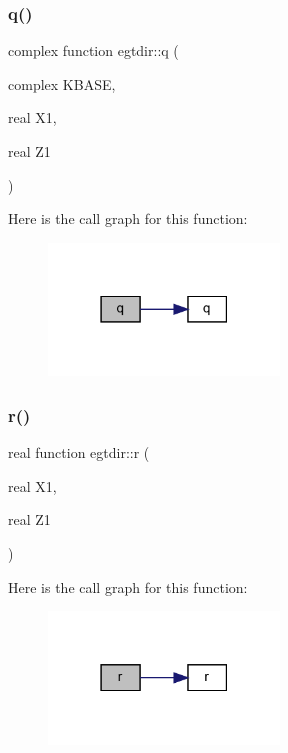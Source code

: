 \mbox{\label{Leroi__c_8f90_a3849611a53bff318a7443ebea8b8b480}} 
\subsubsection{\texorpdfstring{q()}{q()}}
{\footnotesize\ttfamily complex function egtdir\+::q (\begin{DoxyParamCaption}\item[{complex}]{K\+B\+A\+SE,  }\item[{real}]{X1,  }\item[{real}]{Z1 }\end{DoxyParamCaption})}

Here is the call graph for this function\+:\nopagebreak
\begin{figure}[H]
\begin{center}
\leavevmode
\includegraphics[width=174pt]{Leroi__c_8f90_a3849611a53bff318a7443ebea8b8b480_cgraph}
\end{center}
\end{figure}
\mbox{\label{Leroi__c_8f90_ab86561ed12c5864e44152801ef93c7c8}} 
\subsubsection{\texorpdfstring{r()}{r()}}
{\footnotesize\ttfamily real function egtdir\+::r (\begin{DoxyParamCaption}\item[{real}]{X1,  }\item[{real}]{Z1 }\end{DoxyParamCaption})}

Here is the call graph for this function\+:\nopagebreak
\begin{figure}[H]
\begin{center}
\leavevmode
\includegraphics[width=174pt]{Leroi__c_8f90_ab86561ed12c5864e44152801ef93c7c8_cgraph}
\end{center}
\end{figure}
\mbox{\label{Leroi__c_8f90_a175215729f915283d0b8fb5dec72eb0a}} 
